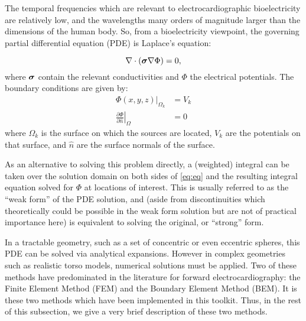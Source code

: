 The temporal frequencies which are relevant to electrocardiographic
bioelectricity are relatively low, and the wavelengths many orders of
magnitude larger than the dimensions of the human body. So, from a
bioelectricity viewpoint, the governing partial differential equation (PDE)
is Laplace's equation:

\begin{equation} \nabla \cdot (\mbox{\boldmath $\sigma$} \nabla \Phi) = 0, \label{eq:eq}
\end{equation}
\noindent where $\mbox{\boldmath $\sigma$}$ contain the relevant conductivities and $\Phi$ the
electrical potentials. The boundary conditions are given by:
\begin{align} \Phi(x,y,z)|_{\Omega_k} &= V_k\\ \left. \frac{\partial
\Phi}{\partial \hat{n}} \right|_\Omega &= 0 \label{eq:bc}
\end{align}
\noindent where $\Omega_{k}$ is the surface on which the sources are located,
$V_k$ are the potentials on that surface, and $\hat{n}$ are the surface normals
of the surface.

As an alternative to solving this problem directly, a (weighted) integral
can be taken over the solution domain on both sides of \autoref{eq:eq}
and the resulting integral equation solved for $\Phi$ at locations of
interest. This is usually referred to as the ``weak form'' of the PDE
solution, and (aside from discontinuities which theoretically could be
possible in the weak form solution but are not of practical importance
here) is equivalent to solving the original, or ``strong'' form.

In a tractable geometry, such as a set of concentric or even eccentric
spheres, this PDE can be solved via analytical expansions. However in
complex geometries such as realistic torso models, numerical solutions must
be applied.
Two of these methods have predominated in the literature for
forward electrocardiography: the Finite Element Method (FEM) and the
Boundary Element Method (BEM). It is these two methods which have been
implemented in this toolkit. Thus, in the rest of this subsection, we give a
very brief description of these two methods.

